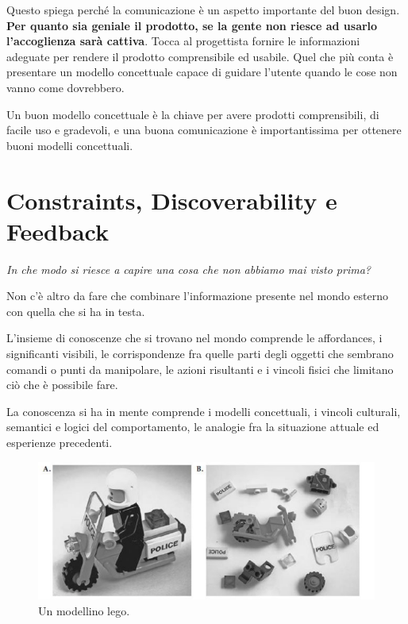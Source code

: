 \documentclass[a4paper,11pt,oneside]{book}
\begin{document}
Questo spiega perché la comunicazione è un aspetto importante del buon design. \textbf{ Per quanto sia geniale il prodotto, se la gente non riesce ad usarlo l'accoglienza sarà cattiva}. Tocca al progettista fornire le informazioni adeguate per rendere il prodotto comprensibile ed usabile. Quel che più conta è presentare un modello concettuale capace di guidare l'utente quando le cose non vanno come dovrebbero.

Un buon modello concettuale è la chiave per avere prodotti comprensibili, di facile uso e gradevoli, e una buona comunicazione è importantissima per ottenere buoni modelli concettuali.

\pagebreak


\chapter{Constraints, Discoverability e Feedback}
\begin{flushleft}
	\textit{In che modo si riesce a capire una cosa che non abbiamo mai visto prima?}
\end{flushleft}

Non c'è altro da fare che combinare l'informazione presente nel mondo esterno con quella che si ha in testa.

L'insieme di conoscenze che si trovano nel mondo comprende le affordances, i significanti visibili, le corrispondenze fra quelle parti degli oggetti che sembrano comandi o punti da manipolare, le azioni risultanti e i vincoli fisici che limitano ciò che è possibile fare.

La conoscenza si ha in mente comprende i modelli concettuali, i vincoli culturali, semantici e logici del comportamento, le analogie fra la situazione attuale ed esperienze precedenti.

\begin{figure}[!h]
	\centering
	\includegraphics[scale = 0.7]{immagini/Modellino Lego.png}
	\caption{Un modellino lego.}
\end{figure}
\end{document}

